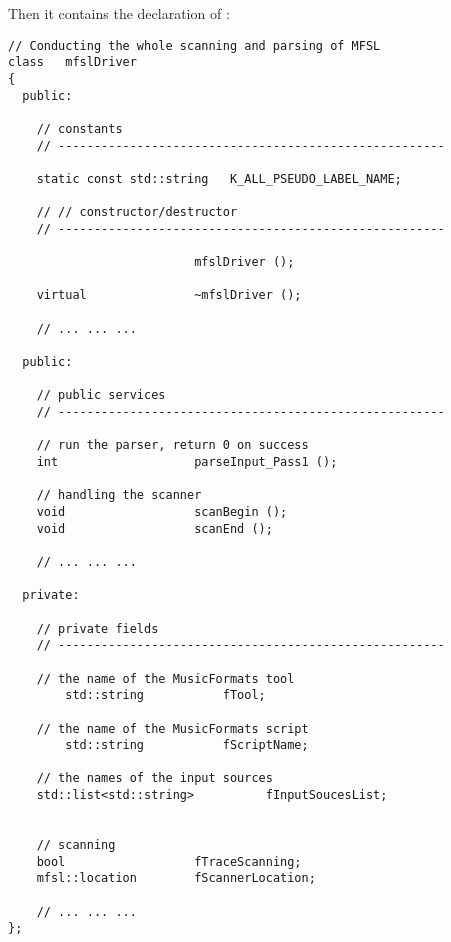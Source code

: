 Then it contains the declaration of :
\begin{lstlisting}[language=CPlusPlus]
// Conducting the whole scanning and parsing of MFSL
class   mfslDriver
{
  public:

    // constants
    // ------------------------------------------------------

    static const std::string   K_ALL_PSEUDO_LABEL_NAME;

    // // constructor/destructor
    // ------------------------------------------------------

                          mfslDriver ();

    virtual               ~mfslDriver ();

	// ... ... ...

  public:

    // public services
    // ------------------------------------------------------

    // run the parser, return 0 on success
    int                   parseInput_Pass1 ();

    // handling the scanner
    void                  scanBegin ();
    void                  scanEnd ();

	// ... ... ...

  private:

    // private fields
    // ------------------------------------------------------

    // the name of the MusicFormats tool
		std::string           fTool;

    // the name of the MusicFormats script
		std::string           fScriptName;

    // the names of the input sources
    std::list<std::string>          fInputSoucesList;


    // scanning
    bool                  fTraceScanning;
    mfsl::location        fScannerLocation;

	// ... ... ...
};
\end{lstlisting}

